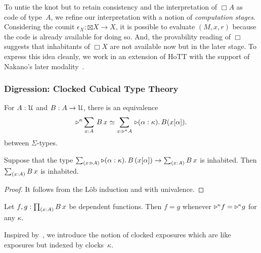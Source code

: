 \documentclass[a4paper,UKenglish,numberwithinsect,cleveref,thm-restate]{lipics-v2021}
\numberwithin{equation}{section}
\theoremstyle{plain}
\begin{document}
To untie the knot but to retain consistency and the interpretation of $\Box A$ as code of type~$A$, we refine our interpretation with a notion of \emph{computation stages}. 
Considering the counit $\epsilon_X\colon \boxtimes X \to X$, it is possible to evaluate $(M, x, r)$ because the code is already available for doing so.
And, the provability reading of $\Box$ suggests that inhabitants of $\Box X$ are not available now but in the later stage.
To express this idea cleanly, we work in an extension of HoTT with the support of Nakano's later modality~\cite{Nakano2000}.

\subsubsection{Digression: Clocked Cubical Type Theory}

\begin{lemma}\label{lem:later-sum}
  For $A : \mathcal{U}$ and $B : A \to \mathcal{U}$, there is an equivalence
  \[
    \eqv{\laterp^\kappa \sm{x : A} B\,x}{\sm{x : \laterp^\kappa A} \laterp (\alpha : \kappa).\, B (x [\alpha])}.
  \]
  between $\Sigma$-types.
\end{lemma}

\begin{corollary} \label{coro:lob-induction-sum}
  Suppose that the type $\sm{x : \laterp A} \laterp (\alpha : \kappa).\,B\,(x[\alpha]) \to \sm{x : A} B\,x$ is inhabited.
  Then $\sm{x : A} B\,x$ is inhabited.
\end{corollary}
\begin{proof}
  It follows from the Löb induction and  with univalence.
\end{proof}

\begin{lemma}\label{lem:later-identity}
  Let $f, g : \prd{x : A} B\,x$ be dependent functions.
  Then $f = g$ whenever $\mathord{\triangleright}^\kappa f = \mathord{\triangleright}^\kappa g$ for any $\kappa$. 
\end{lemma}

Inspired by~, we introduce the notion of clocked exposures which are like exposures but indexed by clocks~$\kappa$.
\end{document}
